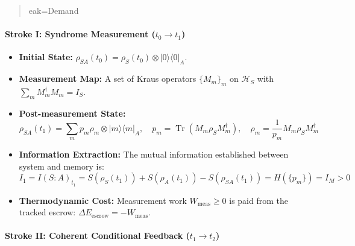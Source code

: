 \documentclass[
]{article}
\providecommand{\tightlist}{%
  \setlength{\itemsep}{0pt}\setlength{\parskip}{0pt}}
\begin{document}
\begin{quote}
eak{}=\allowbreak{}\hspace*{0.525em}\allowbreak{}D\allowbreak{}e\allowbreak{}m\allowbreak{}a\allowbreak{}n\allowbreak{}d\par
\end{quote}

\paragraph{\texorpdfstring{Stroke I: Syndrome Measurement
(\(t_0 \to t_1\))}{Stroke I: Syndrome Measurement (t\_0 \textbackslash to t\_1)}}\label{stroke-i-syndrome-measurement-t_0-to-t_1}

\begin{itemize}
\tightlist
\item
  \textbf{Initial State:}
  \(\rho_{SA}(t_0) = \rho_S(t_0) \otimes |0\rangle\langle 0|_A\).
\item
  \textbf{Measurement Map:} A set of Kraus operators \(\{M_m\}_m\) on
  \(\mathcal{H}_S\) with \(\sum_m M_m^\dagger M_m = I_S\).
\item
  \textbf{Post-measurement State:}
  \[\rho_{SA}(t_1) = \sum_m p_m \rho_m \otimes |m\rangle\langle m|_A, \quad p_m = \operatorname{Tr}(M_m \rho_S M_m^\dagger), \quad \rho_m = \frac{1}{p_m} M_m \rho_S M_m^\dagger\]
\item
  \textbf{Information Extraction:} The mutual information established
  between system and memory is:
  \[I_1 = I(S : A)_{t_1} = S(\rho_S(t_1)) + S(\rho_A(t_1)) - S(\rho_{SA}(t_1)) = H(\{p_m\}) = I_M > 0\]
\item
  \textbf{Thermodynamic Cost:} Measurement work
  \(W_{\mathrm{meas}} \ge 0\) is paid from the tracked escrow:
  \(\Delta E_{\mathrm{escrow}} = -W_{\mathrm{meas}}\).
\end{itemize}

\paragraph{\texorpdfstring{Stroke II: Coherent Conditional Feedback
(\(t_1 \to t_2\))}{Stroke II: Coherent Conditional Feedback (t\_1 \textbackslash to t\_2)}}\label{stroke-ii-coherent-conditional-feedback-t_1-to-t_2}
\end{document}
